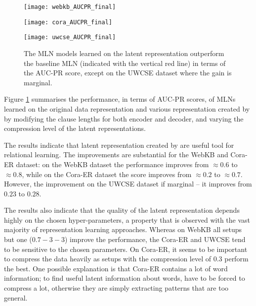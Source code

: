 \begin{figure}
	\centering
    \begin{minipage}[thb]{.32\linewidth}
        \centering
        \texttt{[image: webkb\_AUCPR\_final]}
    \end{minipage}
    \begin{minipage}[htb]{.32\linewidth}
        \centering
        \texttt{[image: cora\_AUCPR\_final]}
    \end{minipage}
    \begin{minipage}[htb]{.32\linewidth}
        \centering
        \texttt{[image: uwcse\_AUCPR\_final]}
    \end{minipage}
    \caption{The MLN models learned on the latent representation outperform the baseline MLN (indicated with the vertical red line) in terms of the AUC-PR score, except on the UWCSE dataset where the gain is marginal.}
    \label{fig:resultsAUCPR}
\end{figure}





Figure \ref{fig:resultsAUCPR} summarises the performance, in terms of AUC-PR scores, of MLNs learned on the original data representation and various representation created by  by modifying the clause lengths for both encoder and decoder, and varying the compression level of the latent representations.




The results indicate that latent representation created by  are useful tool for relational learning.
The improvements are substantial for the WebKB and Cora-ER dataset: on the WebKB dataset the performance improves from $\approx 0.6$ to $\approx 0.8$, while on the Cora-ER dataset the score improves from $\approx 0.2$ to $\approx 0.7$.
However, the improvement on the UWCSE dataset if marginal -- it improves from $0.23$ to $0.28$.



The results also indicate that the quality of the latent representation depends highly on the chosen hyper-parameters, a property that is observed with the vast majority of representation learning approaches.
Whereas on WebKB all setups but one ($0.7-3-3$) improve the performance, the Cora-ER and UWCSE tend to be sensitive to the chosen parameters.
On Cora-ER, it seems to be important to compress the data heavily as setups with the compression level of $0.3$ perform the best.
One possible explanation is that Cora-ER contains a lot of word information; to find useful latent information about words,  have to be forced to compress a lot, otherwise they are simply extracting patterns that are too general.

